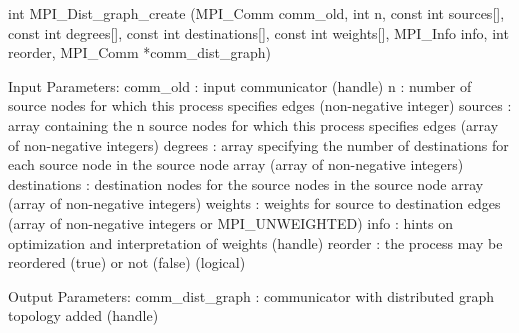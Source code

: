 int MPI_Dist_graph_create
   (MPI_Comm comm_old, int n, const int sources[],
    const int degrees[], const int destinations[], const int weights[],
    MPI_Info info, int reorder,
    MPI_Comm *comm_dist_graph)

Input Parameters:
comm_old : input communicator (handle)
n : number of source nodes for which this process specifies edges (non-negative integer)
sources : array containing the n source nodes for which this process specifies edges (array of non-negative integers)
degrees : array specifying the number of destinations for each source node in the source node array (array of non-negative integers)
destinations : destination nodes for the source nodes in the source
node array (array of
non-negative
integers)
weights : weights for source to destination edges (array of
non-negative integers or MPI_UNWEIGHTED)
info : hints on optimization and interpretation of weights (handle)
reorder : the process may be reordered (true) or not (false) (logical)

Output Parameters:
comm_dist_graph : communicator with distributed graph topology added (handle)
